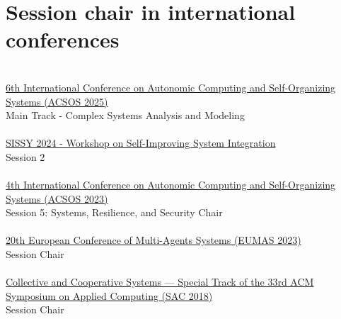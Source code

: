 \section{{\color{black}Session chair in international conferences}}
\halfblankline \\
\href{https://2025.acsos.org/track/acsos-2025-papers?}{6th International Conference on Autonomic Computing and Self-Organizing Systems (ACSOS 2025)}
\\ Main Track - Complex Systems Analysis and Modeling \\
\halfblankline \\
\href{https://2024.acsos.org/track/acsos-2024-workshops#sissy}{SISSY 2024 - Workshop on Self-Improving System Integration}
\\ Session 2 \\
\halfblankline \\
\href{https://conf.researchr.org/home/acsos-2023/}{4th International Conference on Autonomic Computing and Self-Organizing Systems (ACSOS 2023)}
\\ Session 5: Systems, Resilience, and Security Chair \\
\halfblankline \\
\href{https://eumas23.github.io/home/}{20th European Conference of Multi-Agents Systems (EUMAS 2023)}
\\ Session Chair \\
\halfblankline \\
\href{http://sac-cas2018.apice.unibo.it/referees.html}{Collective and Cooperative Systems --- Special Track of the 33rd ACM Symposium on Applied Computing (SAC 2018)}
\\ Session Chair \\
